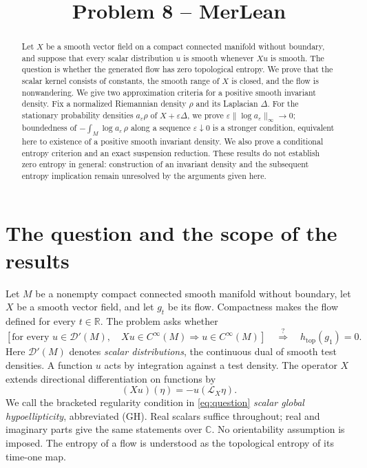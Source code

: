\documentclass[11pt]{article}
\title{Problem 8 -- MerLean}
\author{}
\date{}
\theoremstyle{definition}
\theoremstyle{remark}
\newcommand{\R}{\mathbb R}
\newcommand{\D}{\mathcal D'}
\newcommand{\eps}{\varepsilon}
\newcommand{\htop}{h_{\mathrm{top}}}
\begin{document}
\maketitle

\begin{abstract}
Let $X$ be a smooth vector field on a compact connected manifold without boundary, and suppose that every scalar distribution $u$ is smooth whenever $Xu$ is smooth. The question is whether the generated flow has zero topological entropy. We prove that the scalar kernel consists of constants, the smooth range of $X$ is closed, and the flow is nonwandering. We give two approximation criteria for a positive smooth invariant density. Fix a normalized Riemannian density $\rho$ and its Laplacian $\Delta$. For the stationary probability densities $a_\eps\rho$ of $X+\eps\Delta$, we prove $\eps\|\log a_\eps\|_\infty\to0$; boundedness of $-\int_M\log a_\eps\,\rho$ along a sequence $\eps\downarrow0$ is a stronger condition, equivalent here to existence of a positive smooth invariant density. We also prove a conditional entropy criterion and an exact suspension reduction. These results do not establish zero entropy in general: construction of an invariant density and the subsequent entropy implication remain unresolved by the arguments given here.
\end{abstract}

\section{The question and the scope of the results}

Let $M$ be a nonempty compact connected smooth manifold without boundary, let $X$ be a smooth vector field, and let $g_t$ be its flow. Compactness makes the flow defined for every $t\in\R$. The problem asks whether
\begin{equation}\label{eq:question}
 \left[\text{for every }u\in\D(M),\quad
 Xu\in C^\infty(M)\Longrightarrow u\in C^\infty(M)\right]
 \quad\stackrel{?}{\Longrightarrow}\quad \htop(g_1)=0.
\end{equation}
Here $\D(M)$ denotes \emph{scalar distributions}, the continuous dual of smooth test densities. A function $u$ acts by integration against a test density. The operator $X$ extends directional differentiation on functions by
\[
 (Xu)(\eta)=-u(\mathcal L_X\eta).
\]
We call the bracketed regularity condition in \eqref{eq:question} \emph{scalar global hypoellipticity}, abbreviated (GH). Real scalars suffice throughout; real and imaginary parts give the same statements over $\mathbb C$. No orientability assumption is imposed. The entropy of a flow is understood as the topological entropy of its time-one map.
\end{document}
